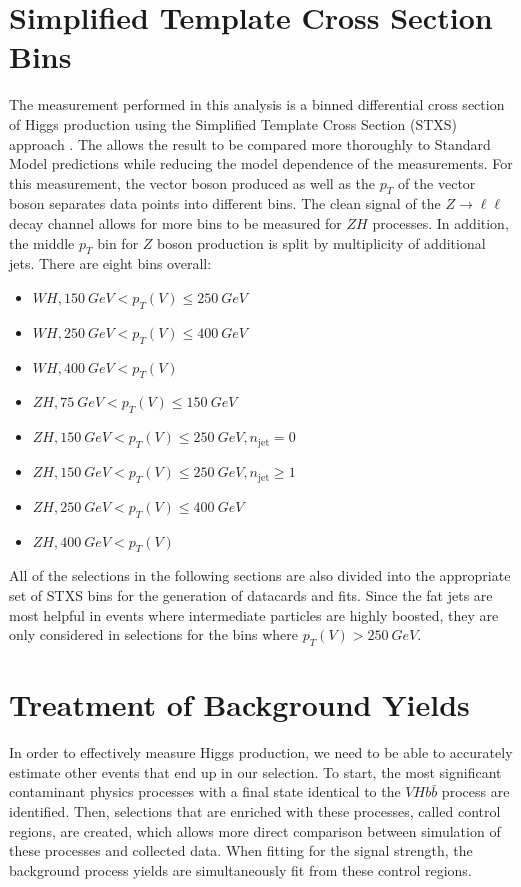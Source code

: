 \section{Simplified Template Cross Section Bins}

The measurement performed in this analysis is a binned differential
cross section of Higgs production
using the Simplified Template Cross Section (STXS) approach \cite{Kato:2687920}.
The allows the result to be compared more thoroughly to Standard Model predictions
while reducing the model dependence of the measurements.
For this measurement, the vector boson produced as well as the $p_T$ of the vector boson
separates data points into different bins.
The clean signal of the $Z\rightarrow\ell\ell$ decay channel allows for more
bins to be measured for $ZH$ processes.
In addition, the middle $p_T$ bin for $Z$ boson production is split by multiplicity
of additional jets.
There are eight bins overall:
\begin{itemize}
\item $WH, \SI{150}{GeV} < p_T(V) \le \SI{250}{GeV}$
\item $WH, \SI{250}{GeV} < p_T(V) \le \SI{400}{GeV}$
\item $WH, \SI{400}{GeV} < p_T(V)$
\item $ZH, \SI{75}{GeV} < p_T(V) \le \SI{150}{GeV}$
\item $ZH, \SI{150}{GeV} < p_T(V) \le \SI{250}{GeV}, n_\mathrm{jet} = 0$
\item $ZH, \SI{150}{GeV} < p_T(V) \le \SI{250}{GeV}, n_\mathrm{jet} \ge 1$
\item $ZH, \SI{250}{GeV} < p_T(V) \le \SI{400}{GeV}$
\item $ZH, \SI{400}{GeV} < p_T(V)$
\end{itemize}
All of the selections in the following sections are also divided into the appropriate
set of STXS bins for the generation of datacards and fits.
Since the fat jets are most helpful in events where
intermediate particles are highly boosted,
they are only considered in selections for the bins where $p_T(V) > \SI{250}{GeV}$.

\section{Treatment of Background Yields}

In order to effectively measure Higgs production,
we need to be able to accurately estimate other events
that end up in our selection.
To start, the most significant contaminant physics processes with a final state
identical to the $V\!Hb\bar{b}$ process are identified.
Then, selections that are enriched with these processes, called control regions, are created,
which allows more direct comparison between simulation of these processes and collected data.
When fitting for the signal strength, the background process yields are simultaneously fit
from these control regions.

